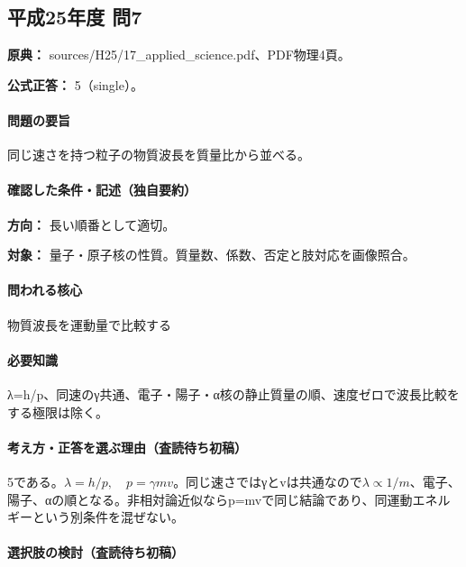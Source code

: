 \subsection{平成25年度 問7}
\label{q:h25-reg-applied-07}

\noindent\textbf{原典：} sources/H25/17\_applied\_science.pdf、PDF物理4頁。

\textbf{公式正答：} 5（single）。

\paragraph{問題の要旨} 同じ速さを持つ粒子の物質波長を質量比から並べる。

\paragraph{確認した条件・記述（独自要約）}\mbox{}\par

\noindent\textbf{方向：} 長い順番として適切。\par

\noindent\textbf{対象：} 量子・原子核の性質。質量数、係数、否定と肢対応を画像照合。\par

\paragraph{問われる核心} 物質波長を運動量で比較する

\paragraph{必要知識} λ=h/p、同速のγ共通、電子・陽子・α核の静止質量の順、速度ゼロで波長比較をする極限は除く。

\paragraph{考え方・正答を選ぶ理由（査読待ち初稿）} 5である。\(\lambda=h/p,\quad p=\gamma mv\)。同じ速さではγとvは共通なので\(\lambda\propto1/m\)、電子、陽子、αの順となる。非相対論近似ならp=\allowbreak{}mvで同じ結論であり、同運動エネルギーという別条件を混ぜない。

\paragraph{選択肢の検討（査読待ち初稿）}\mbox{}\par

